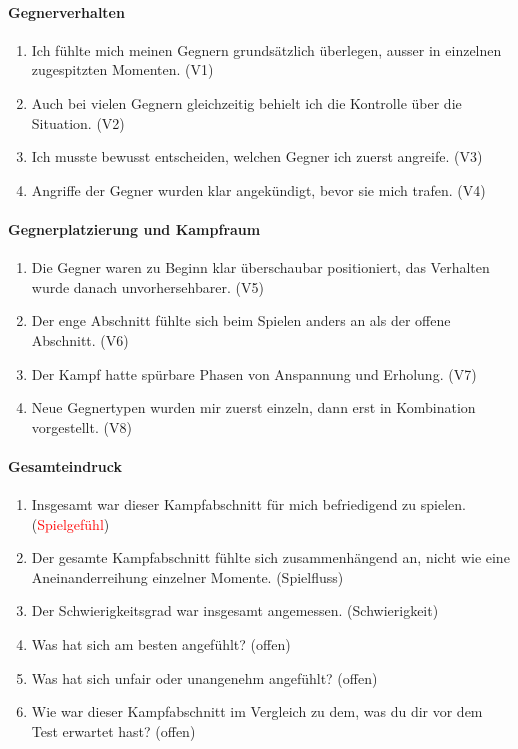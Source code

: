 \documentclass[../Main.tex]{subfiles}
\begin{document}
\paragraph{Gegnerverhalten}
\begin{enumerate}[label=\textbf{Q\arabic*}, leftmargin=1.5cm, itemsep=0.5em]
    \item Ich fühlte mich meinen Gegnern grundsätzlich überlegen, ausser in einzelnen zugespitzten Momenten. \hfill (V1)
    \item Auch bei vielen Gegnern gleichzeitig behielt ich die Kontrolle über die Situation. \hfill (V2)
    \item Ich musste bewusst entscheiden, welchen Gegner ich zuerst angreife. \hfill (V3)
    \item Angriffe der Gegner wurden klar angekündigt, bevor sie mich trafen. \hfill (V4)
\end{enumerate}

\paragraph{Gegnerplatzierung und Kampfraum}
\begin{enumerate}[label=\textbf{Q\arabic*}, leftmargin=1.5cm, itemsep=0.5em, resume]
    \item Die Gegner waren zu Beginn klar überschaubar positioniert, das Verhalten wurde danach unvorhersehbarer. \hfill (V5)
    \item Der enge Abschnitt fühlte sich beim Spielen anders an als der offene Abschnitt. \hfill (V6)
    \item Der Kampf hatte spürbare Phasen von Anspannung und Erholung. \hfill (V7)
    \item Neue Gegnertypen wurden mir zuerst einzeln, dann erst in Kombination vorgestellt. \hfill (V8)
\end{enumerate}

\paragraph{Gesamteindruck}
\begin{enumerate}[label=\textbf{Q\arabic*}, leftmargin=1.5cm, itemsep=0.5em, resume]
    \item Insgesamt war dieser Kampfabschnitt für mich befriedigend zu spielen. \hfill (\textcolor{red}{Spielgefühl})
    \item Der gesamte Kampfabschnitt fühlte sich zusammenhängend an, nicht wie eine Aneinanderreihung einzelner Momente. \hfill (Spielfluss)
    \item Der Schwierigkeitsgrad war insgesamt angemessen. \hfill (Schwierigkeit)
    \item Was hat sich am besten angefühlt? \hfill (offen)
    \item Was hat sich unfair oder unangenehm angefühlt? \hfill (offen)
    \item Wie war dieser Kampfabschnitt im Vergleich zu dem, was du dir vor dem Test erwartet hast? \hfill (offen)
\end{enumerate}
\end{document}
